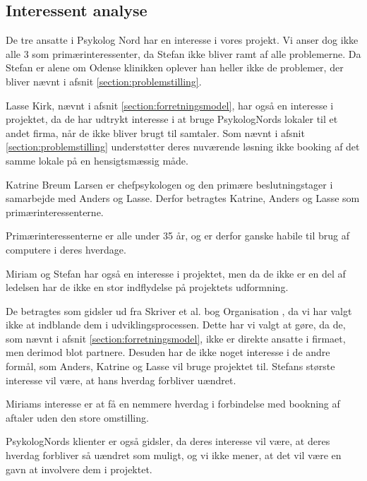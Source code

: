 \subsection{Interessent analyse}

De tre ansatte i Psykolog Nord har en interesse i vores projekt. Vi anser dog ikke alle 3 som primærinteressenter, da Stefan ikke bliver ramt af alle problemerne.
Da Stefan er alene om Odense klinikken oplever han heller ikke de problemer, der bliver nævnt i afsnit \ref{section:problemstilling}.

Lasse Kirk, nævnt i afsnit \ref{section:forretningsmodel}, har også en interesse i projektet, da de har udtrykt interesse i at bruge PsykologNords lokaler til et andet firma, når de ikke bliver brugt til samtaler.
Som nævnt i afsnit \ref{section:problemstilling} understøtter deres nuværende løsning ikke booking af det samme lokale på en hensigtsmæssig måde.

Katrine Breum Larsen er chefpsykologen og den primære beslutningstager i samarbejde med Anders og Lasse.
Derfor betragtes Katrine, Anders og Lasse som primærinteressenterne.

Primærinteressenterne er alle under 35 år, og er derfor ganske habile til brug af computere i deres hverdage.

Miriam og Stefan har også en interesse i projektet, men da de ikke er en del af ledelsen har de ikke en stor indflydelse på projektets udformning.

De betragtes som gidsler ud fra Skriver et al. bog Organisation \cite[s. 435]{interessentanalyse}, da vi har valgt ikke at indblande dem i udviklingsprocessen.
Dette har vi valgt at gøre, da de, som nævnt i afsnit \ref{section:forretningsmodel}, ikke er direkte ansatte i firmaet, men derimod blot partnere.
Desuden har de ikke noget interesse i de andre formål, som Anders, Katrine og Lasse vil bruge projektet til. 
Stefans største interesse vil være, at hans hverdag forbliver uændret.

Miriams interesse er at få en nemmere hverdag i forbindelse med bookning af aftaler uden den store omstilling.

PsykologNords klienter er også gidsler, da deres interesse vil være, at deres hverdag forbliver så uændret som muligt, og vi ikke mener, at det vil være en gavn at involvere dem i projektet.